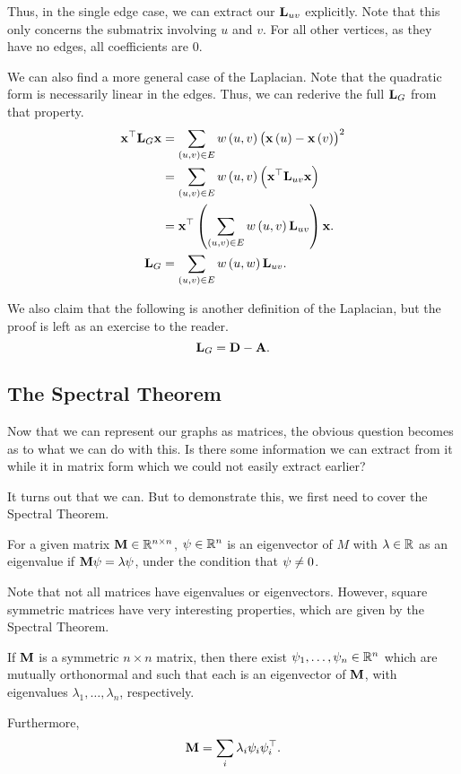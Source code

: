 \documentclass[11pt]{article}
\renewcommand\vec{\V}
\begin{document}
Thus, in the single edge case,
we can extract our $\V{L}_{uv}$ explicitly.
Note that this only concerns the submatrix involving $u$ and $v$.
For all other vertices, as they have no edges, all coefficients are $0$.

We can also find a more general case of the Laplacian.
Note that the quadratic form is necessarily linear in the edges.
Thus, we can rederive the full $\V{L}_G$ from that property.
\begin{align*}
\vec{x}^{\top}\V{L}_{G}\vec{x}&=\sum\limits_{\paren{u,v}\in E}
w\paren{u,v}\paren{\vec{x}\paren{u}-\vec{x}\paren{v}}^2\\
&=\sum\limits_{\paren{u,v}\in E}w\paren{u,v}
\paren{\vec{x}^{\top}\V{L}_{uv}\vec{x}}\\
&=\vec{x}^{\top}\paren{\sum\limits_{\paren{u,v}\in E}
w\paren{u,v}\V{L}_{uv}}\vec{x}.\\
\V{L}_{G}&=\sum\limits_{\paren{u,v}\in E}w\paren{u,w}\V{L}_{uv}.\\
\end{align*}

We also claim that the following is another definition of the Laplacian,
but the proof is left as an exercise to the reader.
$$\V{L}_{G}=\V{D}-\V{A}.$$

\subsection{The Spectral Theorem}
Now that we can represent our graphs as matrices,
the obvious question becomes as to what we can do with this.
Is there some information we can extract from it while it in matrix form
which we could not easily extract earlier?

It turns out that we can.
But to demonstrate this, we first need to cover the Spectral Theorem.
\begin{definition}
For a given matrix $\V{M}\in\rea^{n\times n}$,
$\vec{\psi}\in\rea^{n}$ is an eigenvector of $M$
with $\lambda\in\mathbb R$ as an eigenvalue if $\V{M}\vec{\psi}=\lambda\vec{\psi}$,
under the condition that $\vec{\psi}\neq 0$.
\end{definition}

Note that not all matrices have eigenvalues or eigenvectors.
However, square symmetric matrices have very interesting properties,
which are given by the Spectral Theorem.
\begin{theorem}
If $\V{M}$ is a symmetric $n\times n$ matrix,
then there exist $\vec{\psi}_1,\ldots,\vec{\psi}_n\in\rea^n$
which are mutually orthonormal
and such that each is an eigenvector of $\V{M}$,
with eigenvalues $\lambda_1,\ldots,\lambda_n$, respectively.

Furthermore,
$$\V{M}=\sum\limits_{i}\lambda_{i}\vec{\psi}_{i}\vec{\psi}_{i}^{\top}.$$
\end{theorem}
\end{document}
